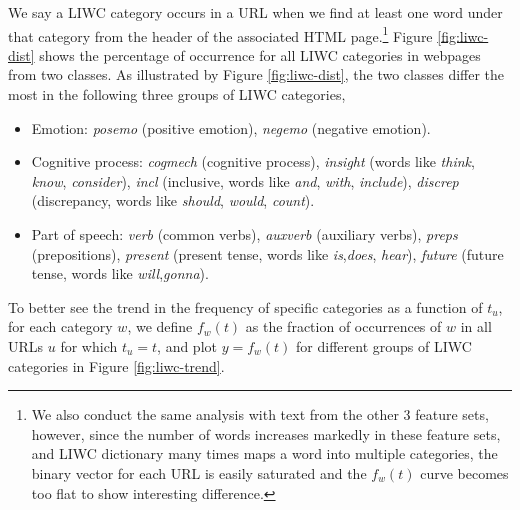 \documentclass[phd,tocprelim]{cornell}
\begin{document}
We say a LIWC category occurs in a URL when we find at least one word under that category from the header of the associated HTML page.\footnote{We also conduct the same analysis with text from the other 3 feature sets, however, since the number of words increases markedly in these feature sets, and LIWC dictionary many times maps a word into multiple categories, the binary vector for each URL is easily saturated and the $f_w(t)$ curve becomes too flat to show interesting difference.} Figure \ref{fig:liwc-dist} shows the percentage of occurrence for all LIWC categories in webpages from two classes. As illustrated by Figure \ref{fig:liwc-dist}, the two classes differ the most in the following three groups of LIWC categories,
\begin{itemize}
\item Emotion: \emph{posemo} (positive emotion), \emph{negemo} (negative emotion).
\item Cognitive process: \emph{cogmech} (cognitive process), \emph{insight} (words like \emph{think}, \emph{know}, \emph{consider}), \emph{incl} (inclusive, words like \emph{and}, \emph{with}, \emph{include}), \emph{discrep} (discrepancy, words like \emph{should}, \emph{would}, \emph{count}).
\item Part of speech: \emph{verb} (common verbs), \emph{auxverb} (auxiliary verbs), \emph{preps} (prepositions), \emph{present} (present tense, words like \emph{is},\emph{does}, \emph{hear}), \emph{future} (future tense, words like \emph{will},\emph{gonna}).
\end{itemize}

To better see the trend in the frequency of specific categories as a function of $t_u$, for each category $w$, we define $f_w(t)$ as the fraction of occurrences of $w$ in all URLs $u$ for which $t_u=t$, and plot $y=f_w(t)$ for different groups of LIWC categories in Figure \ref{fig:liwc-trend}.
\end{document}
